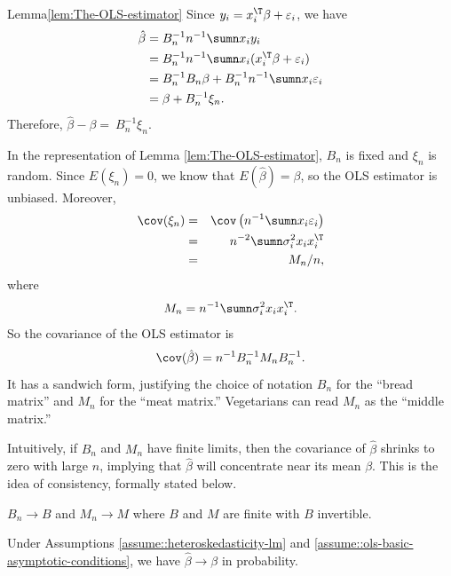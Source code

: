 \begin{myproof}{Lemma}{\ref{lem:The-OLS-estimator}}
Since $y_{i}=x_{i}^{\T}\beta+\varepsilon_{i}$, we have
\begin{align*}
\hat{\beta} & =B_{n}^{-1}n^{-1}\sumn x_{i}y_{i}\\
 & =B_{n}^{-1}n^{-1}\sumn x_{i}(x_{i}^{\T}\beta+\varepsilon_{i})\\
 & =B_{n}^{-1}B_{n}\beta+B_{n}^{-1}n^{-1}\sumn x_{i}\varepsilon_{i}\\
 & =\beta+ B_{n}^{-1} \xi_n. 
\end{align*}
Therefore, $\hat{\beta}-\beta=\ B_{n}^{-1} \xi_n$. 
\end{myproof}



In the representation of Lemma \ref{lem:The-OLS-estimator}, $B_n$ is fixed and $\xi_n$ is random. Since $E(\xi_n) = 0$, we know that $E(\hat{\beta})=\beta$, so the OLS estimator is unbiased. Moreover, 
\begin{eqnarray*}
\cov(\xi_n)  
&=&  \cov\left( n^{-1}\sumn x_{i}\varepsilon_{i} \right)   \\
&=& n^{-2} \sumn \sigma_{i}^{2}x_{i}x_{i}^{\T} \\
&=&  M_n/n,
\end{eqnarray*}
where
$$
M_{n}=n^{-1}\sumn\sigma_{i}^{2}x_{i}x_{i}^{\T}.
$$
So the covariance of the OLS estimator is 
$$
\cov(\hat{\beta})=n^{-1}B_{n}^{-1}M_{n}B_{n}^{-1}.
$$
It has a sandwich form, justifying
the choice of notation $B_n$ for the ``bread matrix'' and $M_n$ for the ``meat matrix.'' Vegetarians can read $M_n$ as the ``middle matrix.''




Intuitively, if $B_{n}$ and $M_{n}$ have finite limits, then the
covariance of $\hat{\beta}$ shrinks to zero with large $n$, implying
that $\hat{\beta}$ will concentrate near its mean $\beta$. This
is the idea of consistency, formally stated below. 
\begin{assumption}
\label{assume::ols-basic-asymptotic-conditions}
$B_{n}\rightarrow B$ and $M_{n}\rightarrow M$
where $B$ and $M$ are finite with $B$ invertible.
\end{assumption}

\begin{theorem}
\label{thm:consistencyofOLS} Under Assumptions \ref{assume::heteroskedasticity-lm} and \ref{assume::ols-basic-asymptotic-conditions}, we have $\hat{\beta}\rightarrow\beta$
in probability.
\end{theorem}


